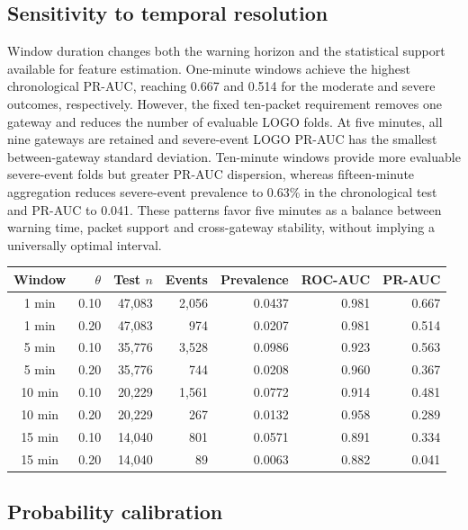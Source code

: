 \documentclass{jot}
\begin{document}
\subsection{Sensitivity to temporal resolution}\label{s:4.8}

Window duration changes both the warning horizon and the statistical support available for feature estimation. One-minute windows achieve the highest chronological PR-AUC, reaching 0.667 and 0.514 for the moderate and severe outcomes, respectively. However, the fixed ten-packet requirement removes one gateway and reduces the number of evaluable LOGO folds. At five minutes, all nine gateways are retained and severe-event LOGO PR-AUC has the smallest between-gateway standard deviation. Ten-minute windows provide more evaluable severe-event folds but greater PR-AUC dispersion, whereas fifteen-minute aggregation reduces severe-event prevalence to 0.63\% in the chronological test and PR-AUC to 0.041. These patterns favor five minutes as a balance between warning time, packet support and cross-gateway stability, without implying a universally optimal interval.

\begin{table}[t]
\centering
\begin{tabular}{@{}crrrrrr@{}}
\toprule
Window & $\theta$ & Test $n$ & Events & Prevalence & ROC-AUC & PR-AUC \\
\midrule
1 min & 0.10 & 47,083 & 2,056 & 0.0437 & 0.981 & 0.667 \\
1 min & 0.20 & 47,083 & 974 & 0.0207 & 0.981 & 0.514 \\
5 min & 0.10 & 35,776 & 3,528 & 0.0986 & 0.923 & 0.563 \\
5 min & 0.20 & 35,776 & 744 & 0.0208 & 0.960 & 0.367 \\
10 min & 0.10 & 20,229 & 1,561 & 0.0772 & 0.914 & 0.481 \\
10 min & 0.20 & 20,229 & 267 & 0.0132 & 0.958 & 0.289 \\
15 min & 0.10 & 14,040 & 801 & 0.0571 & 0.891 & 0.334 \\
15 min & 0.20 & 14,040 & 89 & 0.0063 & 0.882 & 0.041 \\
\bottomrule
\end{tabular}
\end{table}

\subsection{Probability calibration}\label{s:4.9}
\end{document}
